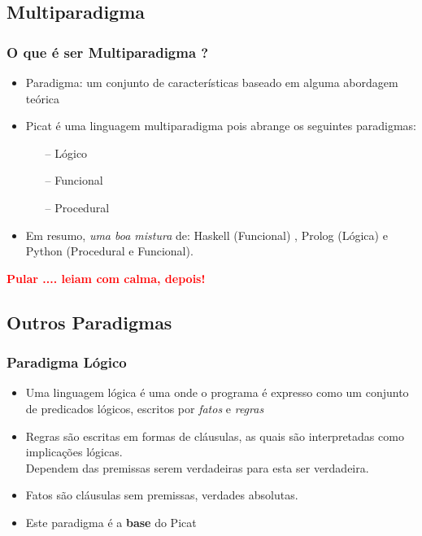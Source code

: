 \subsection{Multiparadigma}
\begin{frame}[fragile]
    \frametitle{O que é ser Multiparadigma ?}

    \begin{itemize}
    
    \item Paradigma: um conjunto de características baseado em alguma abordagem teórica 
    
    \pause
      \item Picat é uma linguagem multiparadigma pois abrange os seguintes paradigmas:
    
      \begin{itemize}
      	\item[--] Lógico
      	\item[--] Funcional
      	\item[--] Procedural
      \end{itemize}
      
     \pause
      \item Em resumo,  \textit{uma boa mistura} de: Haskell (Funcional) , Prolog (Lógica) e 
      Python (Procedural e Funcional).
      
    \end{itemize}
      
\textbf{\textcolor{red}{Pular .... leiam com calma, depois!}}
\end{frame}

\subsection{Outros Paradigmas}
\begin{frame}[fragile]
	\frametitle{Paradigma Lógico}
    
    \begin{itemize}
    
    	\item Uma linguagem lógica é uma onde o programa é expresso como um conjunto
        de predicados lógicos, escritos por \textit{fatos} e \textit{regras}
    
    \pause
    	\item Regras são escritas em formas de cláusulas, as quais são interpretadas como
        implicações lógicas.\\ 
        Dependem das premissas serem verdadeiras para esta ser verdadeira.
        

    \pause
    	\item Fatos são cláusulas sem premissas, verdades absolutas.

        
        \pause
        \item Este   paradigma é a  \textbf{base} do Picat
    \end{itemize}

\end{frame}


